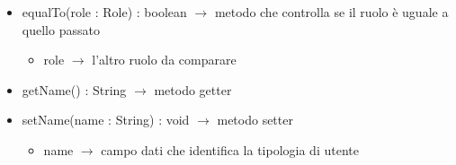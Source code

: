 \begin{description}
\begin{itemize}
	\item equalTo(role : Role) : boolean $\rightarrow$ metodo che controlla se il ruolo è uguale a quello passato\begin{itemize}
		\item role $\rightarrow$ l'altro ruolo da comparare
	\end{itemize}
	
	\item getName() : String $\rightarrow$ metodo getter
	\item setName(name : String) : void $\rightarrow$ metodo setter\begin{itemize}
		\item name $\rightarrow$ campo dati che identifica la tipologia di utente
	\end{itemize}
	
\end{itemize}

\end{description}

\vspace{0.5cm}
\hypertarget{server::data::User}{}
